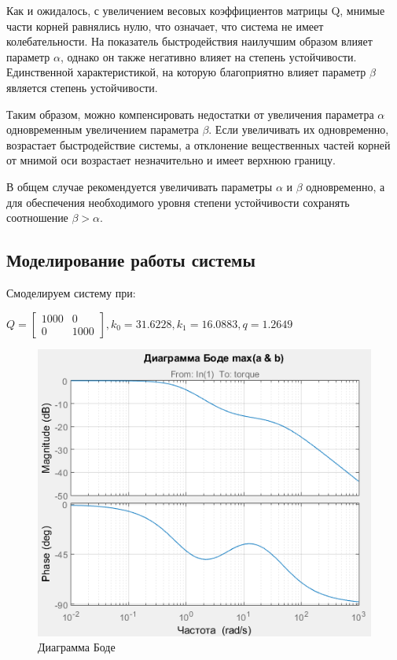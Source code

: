 \documentclass[14pt,a4paper,report]{report}
\begin{document}
Как и ожидалось, с увеличением весовых коэффициентов  матрицы Q, мнимые части корней равнялись нулю, что означает, что система не имеет колебательности. На показатель быстродействия наилучшим образом влияет параметр $\alpha$, однако он также негативно влияет на степень устойчивости. Единственной характеристикой, на которую благоприятно влияет параметр $\beta$ является степень устойчивости. 

Таким образом, можно компенсировать недостатки от увеличения параметра $\alpha$ одновременным увеличением параметра $\beta$. Если увеличивать их одновременно, возрастает быстродействие системы, а отклонение вещественных частей корней от мнимой оси возрастает незначительно и имеет верхнюю границу.

В общем случае рекомендуется увеличивать параметры $\alpha$ и $\beta$ одновременно, а для обеспечения необходимого уровня степени устойчивости сохранять соотношение $\beta>\alpha$.

\clearpage

\subsection{Моделирование работы системы}

Смоделируем систему при:

$Q=\begin{bmatrix}
1000 & 0 \\
0 & 1000 
\end{bmatrix}, k_0=31.6228, k_1=16.0883, q=1.2649$

\begin{figure}[h!]
	\centering
	\includegraphics[scale = 0.70]{images/3.png}
	\caption{Диаграмма Боде}
	\label{image:5}
\end{figure}
\end{document}
